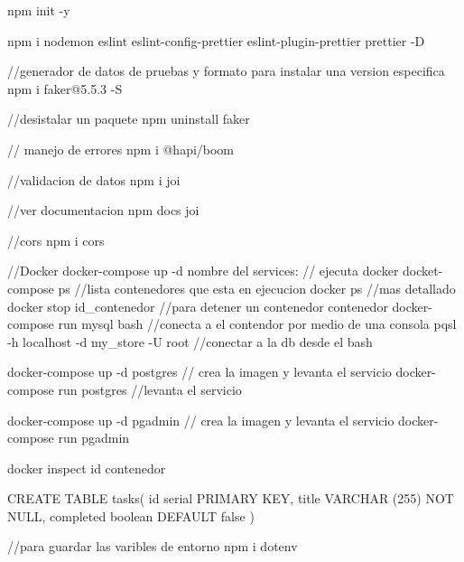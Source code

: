 npm init -y

npm i nodemon eslint eslint-config-prettier eslint-plugin-prettier prettier -D


//generador de datos de pruebas y formato para instalar una version especifica
npm i faker@5.5.3 -S

//desistalar un paquete
npm uninstall faker

// manejo de errores
npm i @hapi/boom

//validacion de datos
npm i joi

//ver documentacion
npm docs joi

//cors
npm i cors

//Docker
docker-compose up -d {nombre del services:} // ejecuta docker
docket-compose ps //lista contenedores que esta en ejecucion
docker ps //mas detallado
docker stop {id_contenedor} //para detener un contenedor contenedor
docker-compose run mysql bash //conecta a el contendor por medio de una consola
pqsl -h localhost -d my_store -U root //conectar a la db desde el bash

docker-compose up -d postgres // crea la imagen y levanta el servicio
docker-compose run postgres //levanta el servicio

docker-compose up -d pgadmin // crea la imagen y levanta el servicio
docker-compose run pgadmin

docker inspect {id contenedor}


CREATE TABLE tasks(
	id serial PRIMARY KEY,
	title VARCHAR (255) NOT NULL,
	completed boolean DEFAULT false
)

//para guardar las varibles de entorno
npm i dotenv
